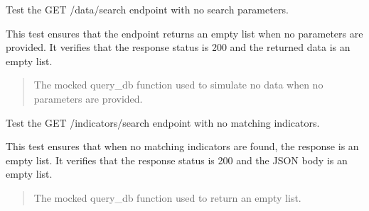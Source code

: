 \documentclass[letterpaper,10pt,english]{sphinxmanual}
\begin{document}

\begin{fulllineitems}
\label{\detokenize{test.my_fastapi:test.my_fastapi.test_main.test_search_data_no_param}}
\pysigstartsignatures
\pysiglinewithargsret
{}
{}
{}
\pysigstopsignatures
\sphinxAtStartPar
Test the GET /data/search endpoint with no search parameters.

\sphinxAtStartPar
This test ensures that the endpoint returns an empty list when no parameters are provided.
It verifies that the response status is 200 and the returned data is an empty list.
\begin{quote}\begin{description}
\sphinxAtStartPar
{} \textendash{} The mocked query\_db function used to simulate no data when no parameters are provided.

\end{description}\end{quote}

\end{fulllineitems}


\begin{fulllineitems}
\label{\detokenize{test.my_fastapi:test.my_fastapi.test_main.test_search_indicators_no_match}}
\pysigstartsignatures
\pysiglinewithargsret
{}
{}
{}
\pysigstopsignatures
\sphinxAtStartPar
Test the GET /indicators/search endpoint with no matching indicators.

\sphinxAtStartPar
This test ensures that when no matching indicators are found, the response is an empty list.
It verifies that the response status is 200 and the JSON body is an empty list.
\begin{quote}\begin{description}
\sphinxAtStartPar
{} \textendash{} The mocked query\_db function used to return an empty list.

\end{description}\end{quote}

\end{fulllineitems}
\end{document}
